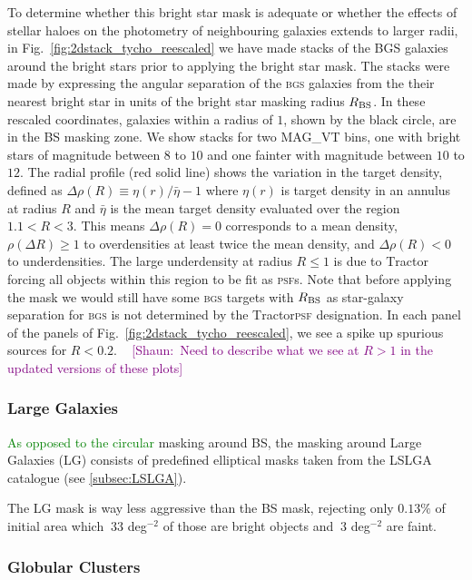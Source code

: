 \documentclass[fleqn,usenatbib]{mnras}
\newcommand{\shaun}[1]{~\newline\noindent \textcolor{Purple}{{ [Shaun:~{#1}]\\}}}
\newcommand{\warn}[2]{\textcolor{Green}{\cancel{{ #1}} {#2}}}
\newcommand{\BGS}{\textsc{bgs}\xspace}
\newcommand{\PSF}{\textsc{psf}\xspace}
\newcommand{\PSFs}{\textsc{psf}s\xspace}
\newcommand{\TRACTOR}{\textsc{T}ractor\xspace}
\begin{document}
To determine whether this bright star mask is adequate or whether the effects of stellar haloes on the photometry of neighbouring galaxies extends to larger radii,  in Fig.~\ref{fig:2dstack_tycho_reescaled}  we have made stacks of the BGS galaxies around the bright stars prior to applying the bright star mask.
The stacks were made by expressing the angular separation of the \BGS galaxies from the their nearest bright star in units of the
bright star masking radius $R_{\rm BS}$.
In these rescaled coordinates, galaxies within a radius of $1$, shown by the black circle, are in the BS masking zone.
We show stacks for two MAG\_VT bins, one with bright stars of magnitude between $8$ to $10$ and one fainter with magnitude between $10$ to $12$. The radial profile (red solid line) shows the variation in the target density, defined as $\Delta\rho(R) \equiv {\eta}(r)/\bar\eta - 1$ where ${\eta}(r)$ is target density in an annulus at radius $R$ and $\bar\eta$ is the mean target density
evaluated over the region $1.1 < R < 3$. This means $\Delta\rho(R) = 0$ corresponds to a mean density, $\rho(\Delta R) \ge 1$ to overdensities at least twice the mean density, and $\Delta\rho(R) < 0$ to underdensities. The large underdensity at radius $R \le 1$ is due to \TRACTOR forcing all objects within this region to be fit as \PSFs. Note that before applying the mask we would still have some \BGS targets with $R_{\rm BS}$ as star-galaxy separation for \BGS is not determined by the \TRACTOR \PSF designation.
In each panel of the panels of 
Fig.~\ref{fig:2dstack_tycho_reescaled}, we see a spike up spurious sources for $R < 0.2$.
\shaun{Need to describe what we see at $R>1$ in the updated versions of these plots}


\subsubsection{Large Galaxies}

\warn{Likewise}{As opposed to the circular} masking around BS, the masking around Large Galaxies (LG) consists of predefined elliptical masks taken from the LSLGA catalogue (see \ref{subsec:LSLGA}).

The LG mask is way less aggressive than the BS mask, rejecting only $0.13 \%$ of initial area which $~33$ deg$^{-2}$ of those are bright objects and $~3$ deg$^{-2}$ are faint.

\subsubsection{Globular Clusters}
\end{document}
